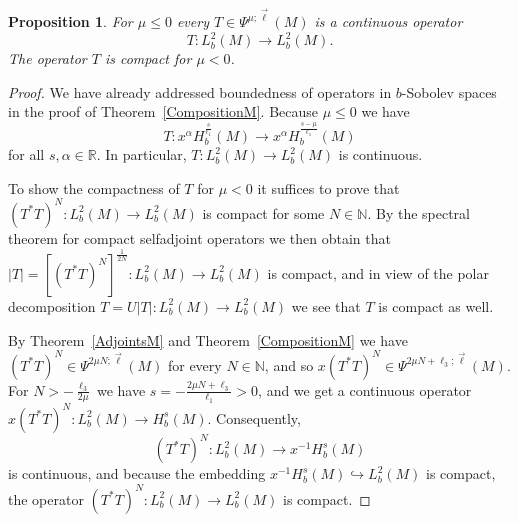 \documentclass[reqno]{amsart}
\numberwithin{equation}{section}
\newtheorem{proposition}[equation]{Proposition}
\theoremstyle{definition}
\def\N{\mathbb N}
\def\R{\mathbb R}
\begin{document}
\begin{proposition}\label{CompactBdd}
For $\mu \leq 0$ every $T \in \Psi^{\mu;\vec{\ell}}(M)$ is a continuous operator
$$
T : L^2_b(M) \to L^2_b(M).
$$
The operator $T$ is compact for $\mu < 0$.
\end{proposition}
\begin{proof}
We have already addressed boundedness of operators in $b$-Sobolev spaces in the proof of Theorem~\ref{CompositionM}. Because $\mu \leq 0$ we have
$$
T : x^{\alpha}H^{\frac{s}{\ell_1}}_b(M) \to x^{\alpha}H^{\frac{s-\mu}{\ell_1}}_b(M)
$$
for all $s,\alpha \in \R$. In particular, $T : L^2_b(M) \to L^2_b(M)$ is continuous.

To show the compactness of $T$ for $\mu < 0$ it suffices to prove that $(T^*T)^N : L^2_b(M) \to L^2_b(M)$ is compact for some $N \in \N$. By the spectral theorem for compact selfadjoint operators we then obtain that $|T| = [(T^*T)^N]^{\frac{1}{2N}} : L^2_b(M) \to L^2_b(M)$ is compact, and in view of the polar decomposition $T = U|T| : L^2_b(M) \to L^2_b(M)$ we see that $T$ is compact as well.

By Theorem~\ref{AdjointsM} and Theorem~\ref{CompositionM} we have $(T^*T)^N \in \Psi^{2\mu N;\vec{\ell}}(M)$ for every $N \in \N$, and so
$x(T^*T)^N \in \Psi^{2\mu N + \ell_3;\vec{\ell}}(M)$. For $N > -\frac{\ell_3}{2\mu}$ we have $s = -\frac{2\mu N + \ell_3}{\ell_1} > 0$, and we get a continuous operator $x(T^*T)^N : L^2_b(M) \to H^s_b(M)$. Consequently,
$$
(T^*T)^N : L^2_b(M) \to x^{-1}H^s_b(M)
$$
is continuous, and because the embedding $x^{-1}H^s_b(M) \hookrightarrow L^2_b(M)$ is compact, the operator $(T^*T)^N : L^2_b(M) \to L^2_b(M)$ is compact.
\end{proof}
\end{document}
